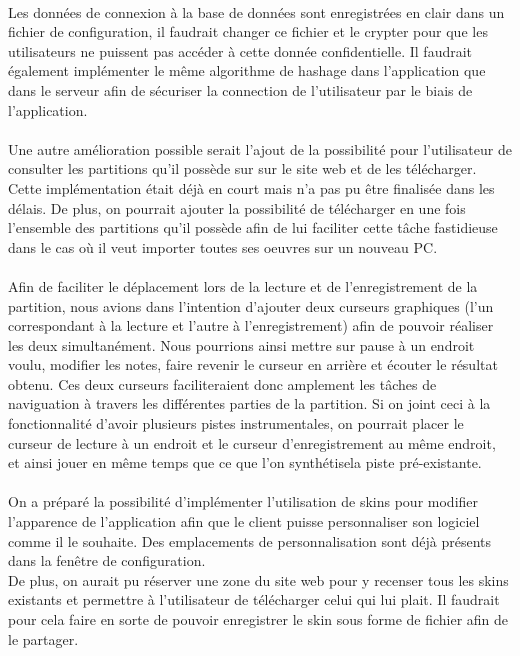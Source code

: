 \paragraph{}
Les données de connexion à la base de données sont enregistrées en clair dans un fichier de configuration, il faudrait changer 
ce fichier et le crypter pour que les utilisateurs ne puissent pas accéder à cette donnée confidentielle. Il faudrait également 
implémenter le même algorithme de hashage dans l'application que dans le serveur afin de sécuriser la connection de l'utilisateur 
par le biais de l'application. 

\paragraph{}
Une autre amélioration possible serait l'ajout de la possibilité pour l'utilisateur de consulter les partitions qu'il possède sur sur le site web et de les télécharger. Cette implémentation était déjà en court mais n'a pas pu être finalisée dans les délais.
De plus, on pourrait ajouter la possibilité de télécharger en une fois l'ensemble des partitions qu'il possède afin de lui faciliter cette tâche fastidieuse dans le cas où il veut importer toutes ses oeuvres sur un nouveau PC.

\paragraph{}
Afin de faciliter le déplacement lors de la lecture et de l'enregistrement de la partition, nous avions dans l'intention d'ajouter 
deux curseurs graphiques (l'un correspondant à la lecture et l'autre à l'enregistrement) afin de pouvoir réaliser les deux simultanément. Nous pourrions ainsi mettre sur pause à un endroit voulu, modifier les notes, faire revenir le curseur en arrière et 
écouter le résultat obtenu. Ces deux curseurs faciliteraient donc amplement les tâches de naviguation à travers les différentes parties de la partition. 
Si on joint ceci à la fonctionnalité d'avoir plusieurs pistes instrumentales, on pourrait placer le curseur de lecture à un endroit et le curseur 
d'enregistrement au même endroit, et ainsi jouer en même temps que ce que l'on synthétisela piste pré-existante.

\paragraph{}
On a préparé la possibilité d'implémenter l'utilisation de skins pour modifier l'apparence de l'application afin que le client puisse personnaliser son logiciel comme il le souhaite. Des emplacements de personnalisation sont déjà présents dans la fenêtre de configuration.\\
De plus, on aurait pu réserver une zone du site web pour y recenser tous les skins existants et permettre à l'utilisateur de télécharger celui qui lui plait. 
Il faudrait pour cela faire en sorte de pouvoir enregistrer le skin sous forme de fichier afin de le partager. 

